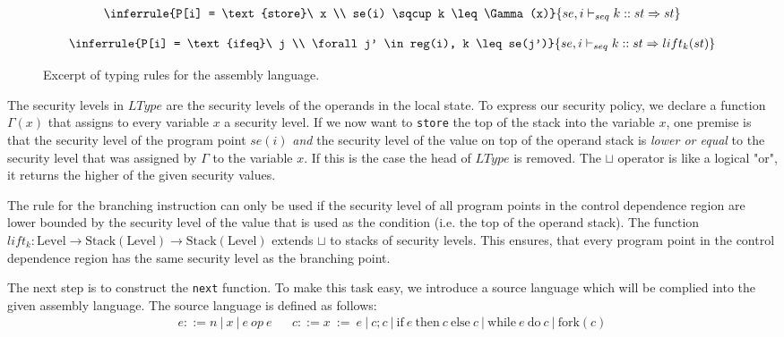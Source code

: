 \documentclass[a4paper,10pt]{llncs}
\begin{document}
\begin{figure}
\begin{minipage}{.5\textwidth}
\begin{align*}
\inferrule{P[i] = \text{store}\ x \\ se(i) \sqcup k \leq \Gamma(x)}
{se, i \vdash_{seq} k :: st \Rightarrow st}
\end{align*}
\end{minipage}
\begin{minipage}{.5\textwidth}
\begin{align*}
\inferrule{P[i] = \text{ifeq}\ j \\ \forall j' \in reg(i), k \leq se(j')}
{se, i \vdash_{seq} k :: st \Rightarrow lift_k(st)}
\end{align*}
\end{minipage}
\caption{Excerpt of typing rules for the assembly language.}
\label{fig:transfer-rules}
\end{figure}

The security levels in $LType$ are the security levels of the operands in the local state. To
express our security policy, we declare a function $\Gamma(x)$ that assigns to every variable
$x$ a security level. If we now want to \texttt{store} the top of the stack into the variable
$x$, one premise is that the security level of the program point $se(i)$ \textit{and} the
security level of the value on top of the operand stack is \textit{lower or equal} to the
security level that was assigned by $\Gamma$ to the variable $x$. If this is the case the head
of $LType$ is removed. The $\sqcup$ operator is like a logical "or", it returns the higher of
the given security values.

The rule for the branching instruction can only be used if the security level of all program
points in the control dependence region are lower bounded by the security level of the value
that is used as the condition (i.e. the top of the operand stack). The function $lift_k :
\text{Level} \rightarrow \text{Stack}(\text{Level}) \rightarrow \text{Stack}(\text{Level})$
extends $\sqcup$ to stacks of security levels. This ensures, that every program point in the control
dependence region has the same security level as the branching point.

The next step is to construct the \texttt{next} function. To make this task easy, we introduce
a source language which will be complied into the given assembly language. The source language
is defined as follows:
\begin{align*}
e ::= n\ |\ x\ |\ e\ op\ e && c ::= x\ :=\ e\ |\ c;c\ |\ \text{if}\ e\ \text{then}\ c\ \text{else}\ c\ |\ \text{while}\ e\ \text{do}\ c\ |\ \text{fork}(c)
\end{align*}
\end{document}
